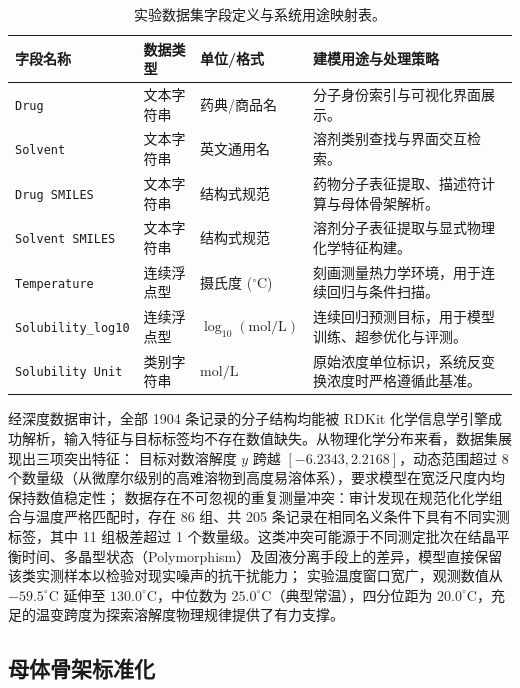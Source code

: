 \begin{table}[htbp]
  \centering\small
  \caption{实验数据集字段定义与系统用途映射表。}
  \label{tab:v2-data-fields}
  \begin{tabularx}{\linewidth}{@{}lllX@{}}
    \toprule
    字段名称 & 数据类型 & 单位/格式 & 建模用途与处理策略 \\
    \midrule
    \texttt{Drug} & 文本字符串 & 药典/商品名 & 分子身份索引与可视化界面展示。 \\
    \texttt{Solvent} & 文本字符串 & 英文通用名 & 溶剂类别查找与界面交互检索。 \\
    \texttt{Drug SMILES} & 文本字符串 & 结构式规范 & 药物分子表征提取、描述符计算与母体骨架解析。 \\
    \texttt{Solvent SMILES} & 文本字符串 & 结构式规范 & 溶剂分子表征提取与显式物理化学特征构建。 \\
    \texttt{Temperature} & 连续浮点型 & 摄氏度 ($^\circ\text{C}$) & 刻画测量热力学环境，用于连续回归与条件扫描。 \\
    \texttt{Solubility\_log10} & 连续浮点型 & $\log_{10}(\mathrm{mol/L})$ & 连续回归预测目标，用于模型训练、超参优化与评测。 \\
    \texttt{Solubility Unit} & 类别字符串 & $\mathrm{mol/L}$ & 原始浓度单位标识，系统反变换浓度时严格遵循此基准。 \\
    \bottomrule
  \end{tabularx}
\end{table}

经深度数据审计，全部 1904 条记录的分子结构均能被 RDKit 化学信息学引擎成功解析，输入特征与目标标签均不存在数值缺失。从物理化学分布来看，数据集展现出三项突出特征：
目标对数溶解度 $y$ 跨越 $[-6.2343, 2.2168]$，动态范围超过 8 个数量级（从微摩尔级别的高难溶物到高度易溶体系），要求模型在宽泛尺度内均保持数值稳定性；
数据存在不可忽视的重复测量冲突：审计发现在规范化化学组合与温度严格匹配时，存在 86 组、共 205 条记录在相同名义条件下具有不同实测标签，其中 11 组极差超过 1 个数量级。这类冲突可能源于不同测定批次在结晶平衡时间、多晶型状态（Polymorphism）及固液分离手段上的差异，模型直接保留该类实测样本以检验对现实噪声的抗干扰能力；
实验温度窗口宽广，观测数值从 $-59.5^\circ\text{C}$ 延伸至 $130.0^\circ\text{C}$，中位数为 $25.0^\circ\text{C}$（典型常温），四分位距为 $20.0^\circ\text{C}$，充足的温变跨度为探索溶解度物理规律提供了有力支撑。

\subsection{母体骨架标准化}


